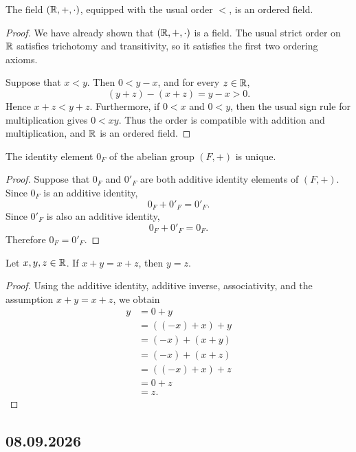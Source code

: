 \documentclass[11pt,a4paper]{amsart}
\begin{document}
\begin{theorem}
  The field \((\mathbb{R},+,\cdot)\), equipped with the usual order \(<\), is an
  ordered field.
\end{theorem}

\begin{proof}
  We have already shown that \((\mathbb{R},+,\cdot)\) is a field. The usual strict
  order on \(\mathbb{R}\) satisfies trichotomy and transitivity, so it satisfies the
  first two ordering axioms.

  Suppose that \(x<y\). Then \(0<y-x\), and for every \(z\in\mathbb{R}\),
  \[
    (y+z)-(x+z)=y-x>0.
  \]
  Hence \(x+z<y+z\). Furthermore, if \(0<x\) and \(0<y\), then the usual
  sign rule for multiplication gives \(0<xy\). Thus the order
  is compatible with addition and multiplication, and \(\mathbb{R}\) is an ordered
  field.
\end{proof}

\begin{theorem}
  The identity element \(0_F\) of the abelian group \((F, +)\) is unique.
\end{theorem}
\begin{proof}
  Suppose that \(0_F\) and \(0'_F\) are both additive identity elements of
  \((F,+)\). Since \(0_F\) is an additive identity,
  \[
    0_F+0'_F=0'_F.
  \]
  Since \(0'_F\) is also an additive identity,
  \[
    0_F+0'_F=0_F.
  \]
  Therefore \(0_F=0'_F\).
\end{proof}

\begin{theorem}
  Let \(x,y,z \in \mathbb{R}\). If \(x+y=x+z\), then \(y=z\).
\end{theorem}

\begin{proof}
  Using the additive identity, additive inverse, associativity, and the
  assumption \(x+y=x+z\), we obtain
  \begin{align*}
    y
    &=0+y \\
    &=((-x)+x)+y \\
    &=(-x)+(x+y) \\
    &=(-x)+(x+z) \\
    &=((-x)+x)+z \\
    &=0+z \\
    &=z.
  \end{align*}
\end{proof}

\subsection{08.09.2026}
\end{document}
